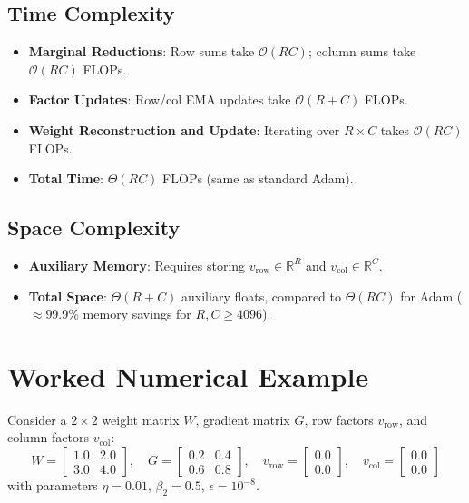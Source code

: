 \documentclass[11pt,a4paper]{article}
\theoremstyle{definition}
\begin{document}
\subsection{Time Complexity}
\begin{itemize}
    \item \textbf{Marginal Reductions}: Row sums take $\mathcal{O}(RC)$; column sums take $\mathcal{O}(RC)$ FLOPs.
    \item \textbf{Factor Updates}: Row/col EMA updates take $\mathcal{O}(R + C)$ FLOPs.
    \item \textbf{Weight Reconstruction and Update}: Iterating over $R \times C$ takes $\mathcal{O}(RC)$ FLOPs.
    \item \textbf{Total Time}: $\Theta(RC)$ FLOPs (same as standard Adam).
\end{itemize}

\subsection{Space Complexity}
\begin{itemize}
    \item \textbf{Auxiliary Memory}: Requires storing $v_{\text{row}} \in \mathbb{R}^R$ and $v_{\text{col}} \in \mathbb{R}^C$.
    \item \textbf{Total Space}: $\Theta(R + C)$ auxiliary floats, compared to $\Theta(RC)$ for Adam ($\approx 99.9\%$ memory savings for $R, C \ge 4096$).
\end{itemize}

\section{Worked Numerical Example}

Consider a $2 \times 2$ weight matrix $W$, gradient matrix $G$, row factors $v_{\text{row}}$, and column factors $v_{\text{col}}$:
\begin{equation}
W = \begin{bmatrix} 1.0 & 2.0 \\ 3.0 & 4.0 \end{bmatrix}, \quad G = \begin{bmatrix} 0.2 & 0.4 \\ 0.6 & 0.8 \end{bmatrix}, \quad v_{\text{row}} = \begin{bmatrix} 0.0 \\ 0.0 \end{bmatrix}, \quad v_{\text{col}} = \begin{bmatrix} 0.0 \\ 0.0 \end{bmatrix}
\end{equation}
with parameters $\eta = 0.01$, $\beta_2 = 0.5$, $\epsilon = 10^{-8}$.
\end{document}
